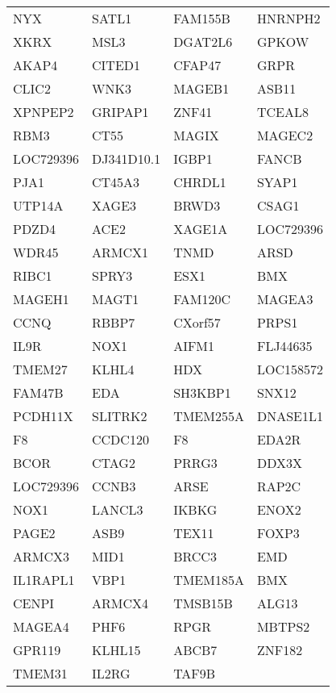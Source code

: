 {\begin{longtable}{llll}
NYX&SATL1&FAM155B&HNRNPH2\tabularnewline
XKRX&MSL3&DGAT2L6&GPKOW\tabularnewline
AKAP4&CITED1&CFAP47&GRPR\tabularnewline
CLIC2&WNK3&MAGEB1&ASB11\tabularnewline
XPNPEP2&GRIPAP1&ZNF41&TCEAL8\tabularnewline
RBM3&CT55&MAGIX&MAGEC2\tabularnewline
LOC729396&DJ341D10.1&IGBP1&FANCB\tabularnewline
PJA1&CT45A3&CHRDL1&SYAP1\tabularnewline
UTP14A&XAGE3&BRWD3&CSAG1\tabularnewline
PDZD4&ACE2&XAGE1A&LOC729396\tabularnewline
WDR45&ARMCX1&TNMD&ARSD\tabularnewline
RIBC1&SPRY3&ESX1&BMX\tabularnewline
MAGEH1&MAGT1&FAM120C&MAGEA3\tabularnewline
CCNQ&RBBP7&CXorf57&PRPS1\tabularnewline
IL9R&NOX1&AIFM1&FLJ44635\tabularnewline
TMEM27&KLHL4&HDX&LOC158572\tabularnewline
FAM47B&EDA&SH3KBP1&SNX12\tabularnewline
PCDH11X&SLITRK2&TMEM255A&DNASE1L1\tabularnewline
\newpage
F8&CCDC120&F8&EDA2R\tabularnewline
BCOR&CTAG2&PRRG3&DDX3X\tabularnewline
LOC729396&CCNB3&ARSE&RAP2C\tabularnewline
NOX1&LANCL3&IKBKG&ENOX2\tabularnewline
PAGE2&ASB9&TEX11&FOXP3\tabularnewline
ARMCX3&MID1&BRCC3&EMD\tabularnewline
IL1RAPL1&VBP1&TMEM185A&BMX\tabularnewline
CENPI&ARMCX4&TMSB15B&ALG13\tabularnewline
MAGEA4&PHF6&RPGR&MBTPS2\tabularnewline
GPR119&KLHL15&ABCB7&ZNF182\tabularnewline
TMEM31&IL2RG&TAF9B&\tabularnewline
\bottomrule
\end{longtable}}
\addtocounter{table}{-1}
\addtocounter{table}{-1}
